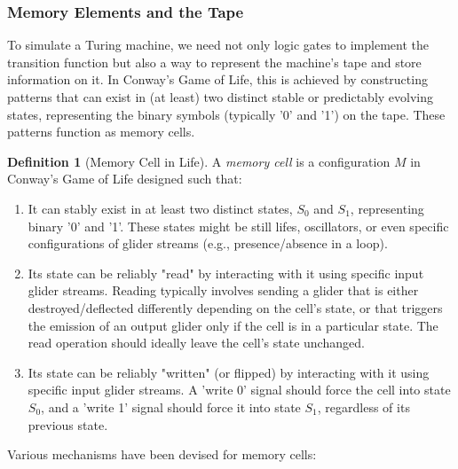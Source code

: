 \documentclass{article}
\theoremstyle{definition}
\newtheorem{definition}{Definition}[section]
\theoremstyle{plain}
\theoremstyle{plain}
\begin{document}
\subsubsection{Memory Elements and the Tape}

To simulate a Turing machine, we need not only logic gates to implement the transition function but also a way to represent the machine's tape and store information on it. In Conway's Game of Life, this is achieved by constructing patterns that can exist in (at least) two distinct stable or predictably evolving states, representing the binary symbols (typically '0' and '1') on the tape. These patterns function as memory cells.

\begin{definition}[Memory Cell in Life]
A \textit{memory cell} is a configuration $M$ in Conway's Game of Life designed such that:
\begin{enumerate}
  \item It can stably exist in at least two distinct states, $S_0$ and $S_1$, representing binary '0' and '1'. These states might be still lifes, oscillators, or even specific configurations of glider streams (e.g., presence/absence in a loop).
  \item Its state can be reliably "read" by interacting with it using specific input glider streams. Reading typically involves sending a glider that is either destroyed/deflected differently depending on the cell's state, or that triggers the emission of an output glider only if the cell is in a particular state. The read operation should ideally leave the cell's state unchanged.
  \item Its state can be reliably "written" (or flipped) by interacting with it using specific input glider streams. A 'write 0' signal should force the cell into state $S_0$, and a 'write 1' signal should force it into state $S_1$, regardless of its previous state.
\end{enumerate}
\end{definition}

Various mechanisms have been devised for memory cells:
\end{document}
